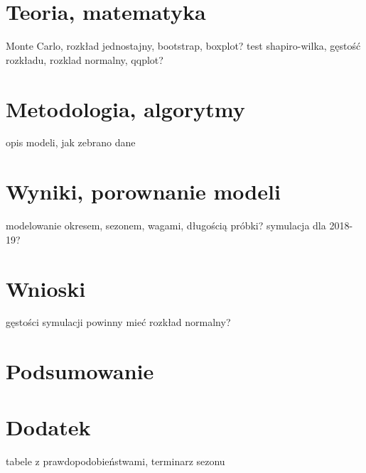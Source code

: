 \documentclass[inzynierska]{pwr_wmat_praca_dyplomowa}
\theoremstyle{plain}
\numberwithin{theorem}{chapter}
\theoremstyle{definition}
\numberwithin{theorem}{chapter}
\begin{document}
\chapter{Teoria, matematyka}
Monte Carlo, rozkład jednostajny, bootstrap, boxplot?
test shapiro-wilka, gęstość rozkładu, rozklad normalny, qqplot?
\chapter{Metodologia, algorytmy}
opis modeli, jak zebrano dane

\chapter{Wyniki, porownanie modeli}
modelowanie okresem, sezonem, wagami, długością próbki?
symulacja dla 2018-19?
\chapter{Wnioski}
gęstości symulacji powinny mieć rozkład normalny?

{\backmatter \chapter{Podsumowanie}}

{\backmatter \chapter{Dodatek}}
tabele z prawdopodobieństwami, terminarz sezonu

\newpage
\end{document}
